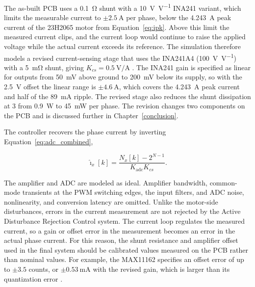 The as-built PCB uses a \SI{0.1}{\ohm} shunt with a \SI{10}{\volt\per\volt} INA241 variant, which limits the measurable current to $\pm\SI{2.5}{\ampere}$ per phase, below the \SI{4.243}{\ampere} peak current of the 23H2065 motor from Equation~\eqref{eq:ipk}. Above this limit the measured current clips, and the current loop would continue to raise the applied voltage while the actual current exceeds its reference. The simulation therefore models a revised current-sensing stage that uses the INA241A4 (\SI{100}{\volt\per\volt}) with a \SI{5}{\milli\ohm} shunt, giving $K_{cs} = \SI{0.5}{\volt\per\ampere}$ \cite{ti_ina241_2023}. The INA241 gain is specified as linear for outputs from \SI{50}{\milli\volt} above ground to \SI{200}{\milli\volt} below its supply, so with the \SI{2.5}{\volt} offset the linear range is $\pm\SI{4.6}{\ampere}$, which covers the \SI{4.243}{\ampere} peak current and half of the \SI{89}{\milli\ampere} ripple. The revised stage also reduces the shunt dissipation at \SI{3}{\ampererms} from \SI{0.9}{\watt} to \SI{45}{\milli\watt} per phase. The revision changes two components on the PCB and is discussed further in Chapter~\ref{conclusion}.

The controller recovers the phase current by inverting Equation~\eqref{eq:adc_combined},

\begin{equation}
	\hat{\imath}_x[k] = \frac{N_x[k] - 2^{N-1}}{K_{\mathrm{adc}} K_{cs}}.
	\label{eq:adc_decode}
\end{equation}


The amplifier and ADC are modeled as ideal. Amplifier bandwidth, common-mode transients at the PWM switching edges, the input filters, and ADC noise, nonlinearity, and conversion latency are omitted. Unlike the motor-side disturbances, errors in the current measurement are not rejected by the Active Disturbance Rejection Control system. The current loop regulates the measured current, so a gain or offset error in the measurement becomes an error in the actual phase current. For this reason, the shunt resistance and amplifier offset used in the final system should be calibrated values measured on the PCB rather than nominal values. For example, the MAX11162 specifies an offset error of up to $\pm3.5$ counts, or $\pm\SI{0.53}{\milli\ampere}$ with the revised gain, which is larger than its quantization error \cite{adi_max11162_2017}.

